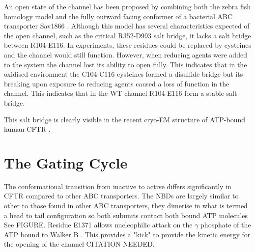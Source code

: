 An open state of the channel has been proposed by combining both the zebra fish homology model and the fully outward facing conformer of a bacterial ABC transporter Sav1866 \cite{Hoffmann2018}. Although this model has several characteristics expected of the open channel, such as the critical R352-D993 salt bridge, it lacks a salt bridge between R104-E116. In experiments, these residues could be replaced by cysteines and the channel would still function. However, when reducing agents were added to the system the channel lost its ability to open fully. This indicates that in the oxidised environment the C104-C116 cysteines formed a disulfide bridge but its breaking upon exposure to reducing agents caused a loss of function in the channel. This indicates that in the WT channel R104-E116 form a stable salt bridge. 

This salt bridge is clearly visible in the recent cryo-EM structure of ATP-bound human CFTR \cite{zhang2018}.

\section{The Gating Cycle}
The conformational transition from inactive to active differs significantly in CFTR compared to other ABC transporters. The NBDs are largely similar to other to those found in other ABC transporters, they dimerise in what is termed a head to tail configuration so both subunits contact both bound ATP molecules \cite{} See FIGURE. Residue E1371 allows nucleophilic attack on the $\gamma$ phosphate of the ATP bound to Walker B \cite{Stratford2007}. This provides a "kick" to provide the kinetic energy for the opening of the channel CITATION NEEDED. 

